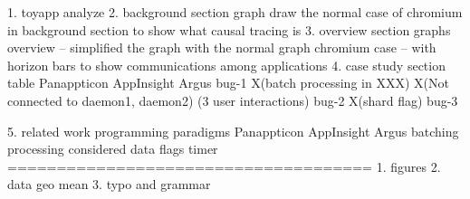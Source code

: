 1. toyapp analyze
2. background section graph
    draw the normal case of chromium in background section to show what causal tracing is
3. overview section graphs
    overview -- simplified the graph with the normal graph
    chromium case -- with horizon bars to show communications among applications
4. case study section table
            Panappticon                         AppInsight                                  Argus
    bug-1   X(batch processing in XXX)         X(Not connected to daemon1, daemon2)         (3 user interactions)
    bug-2   X(shard flag)
    bug-3 

5. related work
    programming paradigms   Panappticon          AppInsight                 Argus 
    batching processing                                                  considered
    data flags
    timer
=====================================
1. figures
2. data geo mean
3. typo and grammar

